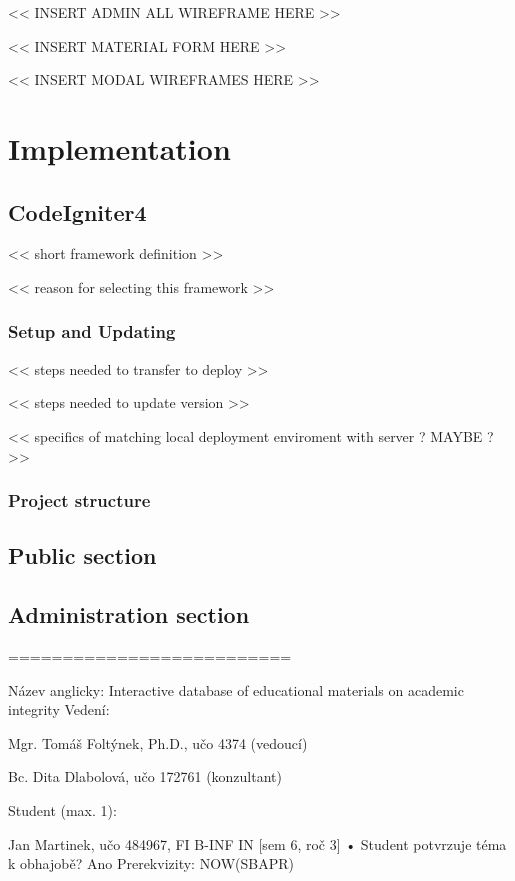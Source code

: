 \documentclass[
  digital,     %
  oneside,     %
  nosansbold,  %
  colorbold, %
  lof,         %
  lot,         %
]{fithesis4}
\begin{document}
<< INSERT ADMIN ALL WIREFRAME HERE >>

<< INSERT MATERIAL FORM HERE >>

<< INSERT MODAL WIREFRAMES HERE >>

\chapter{Implementation}

\section{CodeIgniter4}

<< short framework definition >>

<< reason for selecting this framework >>

\subsection{Setup and Updating}

<< steps needed to transfer to deploy >>

<< steps needed to update version >>

<< specifics of matching local deployment enviroment with server ? MAYBE ?>>

\subsection{Project structure}

\section{Public section}

\section{Administration section}

\newpage

==========================

Název anglicky: Interactive database of educational materials on academic integrity
Vedení:

Mgr. Tomáš Foltýnek, Ph.D., učo 4374 (vedoucí)   

Bc. Dita Dlabolová, učo 172761 (konzultant)   

Student (max. 1):

Jan Martinek, učo 484967, FI B-INF IN [sem 6, roč 3] • Student potvrzuje téma k obhajobě? Ano
Prerekvizity: NOW(SBAPR)
\end{document}
